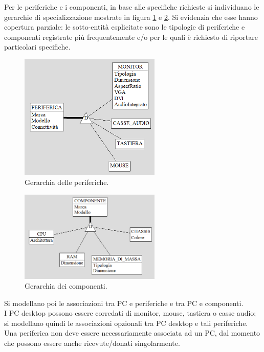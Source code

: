 \documentclass[a4paper,12pt]{report}
\begin{document}
\noindent Per le periferiche e i componenti, in base alle specifiche richieste si individuano le gerarchie di specializzazione mostrate in figura \ref{images:periferica} e \ref{images:componente}. Si evidenzia che esse hanno copertura parziale: le sotto-entità esplicitate sono le tipologie di periferiche e componenti registrate più frequentemente e/o per le quali è richiesto di riportare particolari specifiche.

\begin{figure}[H]
    \centering
	\includegraphics[width=0.6\textwidth]{images/periferica.png}
    \caption{Gerarchia delle periferiche.}
	\label{images:periferica}
\end{figure}

\begin{figure}[H]
    \centering
	\includegraphics[width=0.6\textwidth]{images/componente.png}
    \caption{Gerarchia dei componenti.}
	\label{images:componente}
\end{figure}

\noindent Si modellano poi le associazioni tra PC e periferiche e tra PC e componenti. 
\\
I PC desktop possono essere corredati di monitor, mouse, tastiera o casse audio; si modellano quindi le associazioni opzionali tra PC desktop e tali periferiche. \\
Una periferica non deve essere necessariamente associata ad un PC, dal momento che possono essere anche ricevute/donati singolarmente.
\end{document}
